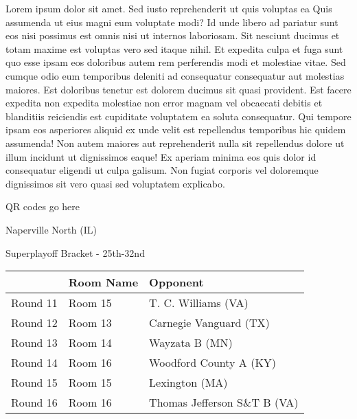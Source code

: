 \documentclass{article}%
\begin{document}
\vspace*{8pt}%
\linebreak%
\newline%
\newline%
    Lorem ipsum dolor sit amet. Sed iusto reprehenderit ut quis voluptas ea Quis assumenda ut eius magni eum voluptate modi? Id unde libero ad pariatur sunt eos nisi possimus est omnis nisi ut internos laboriosam. Sit nesciunt ducimus et totam maxime est voluptas vero sed itaque nihil. Et expedita culpa et fuga sunt quo esse ipsam eos doloribus autem rem perferendis modi et molestiae vitae.\newline%
\newline%
    Sed cumque odio eum temporibus deleniti ad consequatur consequatur aut molestias maiores. Est doloribus tenetur est dolorem ducimus sit quasi provident. Est facere expedita non expedita molestiae non error magnam vel obcaecati debitis et blanditiis reiciendis est cupiditate voluptatem ea soluta consequatur. Qui tempore ipsam eos asperiores aliquid ex unde velit est repellendus temporibus hic quidem assumenda!\newline%
\newline%
    Non autem maiores aut reprehenderit nulla sit repellendus dolore ut illum incidunt ut dignissimos eaque! Ex aperiam minima eos quis dolor id consequatur eligendi ut culpa galisum. Non fugiat corporis vel doloremque dignissimos sit vero quasi sed voluptatem explicabo.\newline%
\newline%
\vspace*{30pt}%
\begin{center}%
\begin{Huge}%
QR codes go here%
\end{Huge}%
\end{center}%
\newpage%
\begin{center}%
\begin{Huge}%
Naperville North (IL)%
\end{Huge}%
\vspace*{8pt}%
\linebreak%
\begin{Large}%
Superplayoff Bracket {-} 25th{-}32nd%
\end{Large}%
\end{center}%
%
\begin{tabularx}{\textwidth}{|c|Y|Y|}%
\hline%
&Room Name&Opponent\\%
\hline%
Round 11&Room 15&T. C. Williams (VA)\\%
Round 12&Room 13&Carnegie Vanguard (TX)\\%
Round 13&Room 14&Wayzata B (MN)\\%
Round 14&Room 16&Woodford County A (KY)\\%
Round 15&Room 15&Lexington (MA)\\%
Round 16&Room 16&Thomas Jefferson S\&T B (VA)\\%
\hline%
\end{tabularx}%
\end{document}
